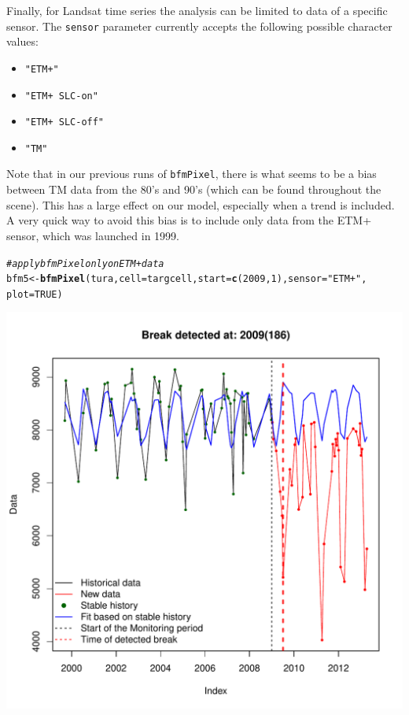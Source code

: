 \documentclass{article}\usepackage[]{graphicx}\usepackage[]{color}
\makeatletter
\def\maxwidth{ %
  \ifdim\Gin@nat@width>\linewidth
    \linewidth
  \else
    \Gin@nat@width
  \fi
}
\newcommand{\hlnum}[1]{\textcolor[rgb]{0.686,0.059,0.569}{#1}}%
\newcommand{\hlstr}[1]{\textcolor[rgb]{0.192,0.494,0.8}{#1}}%
\newcommand{\hlcom}[1]{\textcolor[rgb]{0.678,0.584,0.686}{\textit{#1}}}%
\newcommand{\hlstd}[1]{\textcolor[rgb]{0.345,0.345,0.345}{#1}}%
\newcommand{\hlkwb}[1]{\textcolor[rgb]{0.69,0.353,0.396}{#1}}%
\newcommand{\hlkwc}[1]{\textcolor[rgb]{0.333,0.667,0.333}{#1}}%
\newcommand{\hlkwd}[1]{\textcolor[rgb]{0.737,0.353,0.396}{\textbf{#1}}}%
\newenvironment{kframe}{%
 \def\at@end@of@kframe{}%
 \ifinner\ifhmode%
  \def\at@end@of@kframe{\end{minipage}}%
  \begin{minipage}{\columnwidth}%
 \fi\fi%
 \def\FrameCommand##1{\hskip\@totalleftmargin \hskip-\fboxsep
 \colorbox{shadecolor}{##1}\hskip-\fboxsep
     \hskip-\linewidth \hskip-\@totalleftmargin \hskip\columnwidth}%
 \MakeFramed {\advance\hsize-\width
   \@totalleftmargin\z@ \linewidth\hsize
   \@setminipage}}%
 {\par\unskip\endMakeFramed%
 \at@end@of@kframe}
\newenvironment{knitrout}{}{} %
\def\code#1{\texttt{#1}}
\makeatother
\begin{document}
Finally, for Landsat time series the analysis can be limited to data of a specific sensor. The \code{sensor} parameter currently accepts the following possible character values:
\begin{itemize}
\item \code{"ETM+"}
\item \code{"ETM+ SLC-on"}
\item \code{"ETM+ SLC-off"}
\item \code{"TM"}
\end{itemize}

Note that in our previous runs of \code{bfmPixel}, there is what seems to be a bias between TM data from the 80's and 90's (which can be found throughout the scene). This has a large effect on our model, especially when a trend is included. A very quick way to avoid this bias is to include only data from the ETM+ sensor, which was launched in 1999.

\begin{knitrout}
\color{fgcolor}\begin{kframe}
\begin{alltt}
\hlcom{# apply bfmPixel only on ETM+ data}
\hlstd{bfm5} \hlkwb{<-} \hlkwd{bfmPixel}\hlstd{(tura,} \hlkwc{cell} \hlstd{= targcell,} \hlkwc{start} \hlstd{=} \hlkwd{c}\hlstd{(}\hlnum{2009}\hlstd{,} \hlnum{1}\hlstd{),} \hlkwc{sensor} \hlstd{=} \hlstr{"ETM+"}\hlstd{,}
    \hlkwc{plot} \hlstd{=} \hlnum{TRUE}\hlstd{)}
\end{alltt}
\end{kframe}
\includegraphics[width=\maxwidth]{figure/bfmPixel-sensor} 

\end{knitrout}
\end{document}
